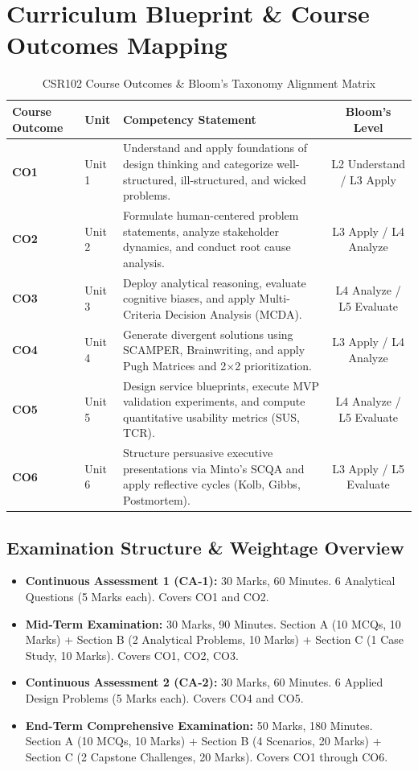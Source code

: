 \section*{Curriculum Blueprint \& Course Outcomes Mapping}

\begin{table}[htbp]
\centering
\begin{tabularx}{\linewidth}{|l|l|X|c|} \hline
\textbf{Course Outcome} & \textbf{Unit} & \textbf{Competency Statement} & \textbf{Bloom's Level} \\ \hline
\textbf{CO1} & Unit 1 & Understand and apply foundations of design thinking and categorize well-structured, ill-structured, and wicked problems. & L2 Understand / L3 Apply \\ \hline
\textbf{CO2} & Unit 2 & Formulate human-centered problem statements, analyze stakeholder dynamics, and conduct root cause analysis. & L3 Apply / L4 Analyze \\ \hline
\textbf{CO3} & Unit 3 & Deploy analytical reasoning, evaluate cognitive biases, and apply Multi-Criteria Decision Analysis (MCDA). & L4 Analyze / L5 Evaluate \\ \hline
\textbf{CO4} & Unit 4 & Generate divergent solutions using SCAMPER, Brainwriting, and apply Pugh Matrices and 2$\times$2 prioritization. & L3 Apply / L4 Analyze \\ \hline
\textbf{CO5} & Unit 5 & Design service blueprints, execute MVP validation experiments, and compute quantitative usability metrics (SUS, TCR). & L4 Analyze / L5 Evaluate \\ \hline
\textbf{CO6} & Unit 6 & Structure persuasive executive presentations via Minto's SCQA and apply reflective cycles (Kolb, Gibbs, Postmortem). & L3 Apply / L5 Evaluate \\ \hline
\end{tabularx}
\caption{CSR102 Course Outcomes \& Bloom's Taxonomy Alignment Matrix}
\end{table}

\subsection*{Examination Structure \& Weightage Overview}
\begin{itemize}
    \item \textbf{Continuous Assessment 1 (CA-1):} 30 Marks, 60 Minutes. 6 Analytical Questions (5 Marks each). Covers CO1 and CO2.
    \item \textbf{Mid-Term Examination:} 30 Marks, 90 Minutes. Section A (10 MCQs, 10 Marks) + Section B (2 Analytical Problems, 10 Marks) + Section C (1 Case Study, 10 Marks). Covers CO1, CO2, CO3.
    \item \textbf{Continuous Assessment 2 (CA-2):} 30 Marks, 60 Minutes. 6 Applied Design Problems (5 Marks each). Covers CO4 and CO5.
    \item \textbf{End-Term Comprehensive Examination:} 50 Marks, 180 Minutes. Section A (10 MCQs, 10 Marks) + Section B (4 Scenarios, 20 Marks) + Section C (2 Capstone Challenges, 20 Marks). Covers CO1 through CO6.
\end{itemize}
\newpage
